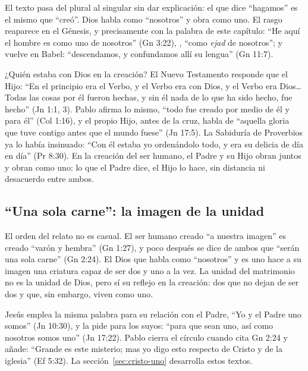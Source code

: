 El texto pasa del plural al singular sin dar explicación: el que dice ``hagamos'' es el mismo que ``creó''. Dios habla como ``nosotros'' y obra como uno. El rasgo reaparece en el Génesis, y precisamente con la palabra de este capítulo: ``He aquí el hombre es como uno de nosotros'' (Gn 3:22), , ``como \emph{ejad} de nosotros''; y vuelve en Babel: ``descendamos, y confundamos allí su lengua'' (Gn 11:7).

¿Quién estaba con Dios en la creación? El Nuevo Testamento responde que el Hijo: ``En el principio era el Verbo, y el Verbo era con Dios, y el Verbo era Dios\ldots{} Todas las cosas por él fueron hechas, y sin él nada de lo que ha sido hecho, fue hecho'' (Jn 1:1, 3). Pablo afirma lo mismo, ``todo fue creado por medio de él y para él'' (Col 1:16), y el propio Hijo, antes de la cruz, habla de ``aquella gloria que tuve contigo antes que el mundo fuese'' (Jn 17:5). La Sabiduría de Proverbios ya lo había insinuado: ``Con él estaba yo ordenándolo todo, y era su delicia de día en día'' (Pr 8:30). En la creación del ser humano, el Padre y su Hijo obran juntos y obran como uno: lo que el Padre dice, el Hijo lo hace, sin distancia ni desacuerdo entre ambos.


\subsection{“Una sola carne”: la imagen de la unidad}
El orden del relato no es casual. El ser humano creado ``a nuestra imagen'' es creado ``varón y hembra'' (Gn 1:27), y poco después se dice de ambos que ``serán una sola carne'' (Gn 2:24). El Dios que habla como ``nosotros'' y es uno hace a su imagen una criatura capaz de ser dos y uno a la vez. La unidad del matrimonio no es la unidad de Dios, pero sí su reflejo en la creación: dos que no dejan de ser dos y que, sin embargo, viven como uno.

Jesús emplea la misma palabra para su relación con el Padre, ``Yo y el Padre uno somos'' (Jn 10:30), y la pide para los suyos: ``para que sean uno, así como nosotros somos uno'' (Jn 17:22). Pablo cierra el círculo cuando cita Gn 2:24 y añade: ``Grande es este misterio; mas yo digo esto respecto de Cristo y de la iglesia'' (Ef 5:32). La sección~\ref{sec:cristo-uno} desarrolla estos textos.

